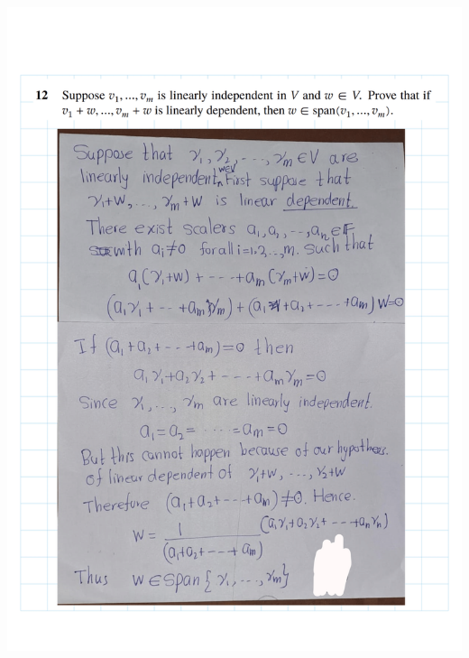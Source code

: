 \documentclass[
]{book}
\theoremstyle{definition}
\theoremstyle{definition}
\theoremstyle{definition}
\theoremstyle{definition}
\theoremstyle{remark}
\begin{document}
\includegraphics{fig/Ex2A/Ex2A-14.png}
\end{document}

